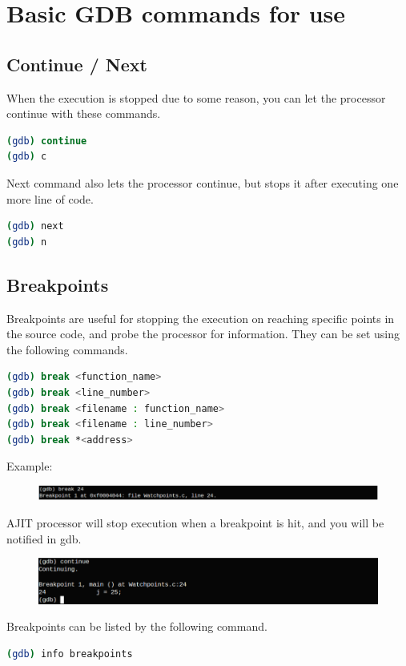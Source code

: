 \documentclass[a4paper, 11pt]{article}
\begin{document}
\section*{Basic GDB commands for use}
\subsection*{Continue / Next}
When the execution is stopped due to some reason, you can let the processor continue with these commands.
\begin{lstlisting}[language=bash]
(gdb) continue
(gdb) c
\end{lstlisting}
Next command also lets the processor continue, but stops it after executing one more line of code.
\begin{lstlisting}[language=bash]
(gdb) next
(gdb) n
\end{lstlisting}

\subsection*{Breakpoints}
Breakpoints are useful for stopping the execution on reaching specific points in the source code, and probe the processor for information. They can be set using the following commands.
\begin{lstlisting}[language=bash]
(gdb) break <function_name>
(gdb) break <line_number>
(gdb) break <filename : function_name>
(gdb) break <filename : line_number>
(gdb) break *<address>
\end{lstlisting}
Example:
\\
\begin{figure}[H]
	\centering
	\includegraphics[width=0.8\columnwidth]{Figs/fourth.png}
\end{figure}

AJIT processor will stop execution when a breakpoint is hit, and you will be notified in gdb.
\begin{figure}[H]
	\centering
	\includegraphics[width=0.8\columnwidth]{Figs/fifth.png}
\end{figure}
Breakpoints can be listed by the following command.
\begin{lstlisting}[language=bash]
(gdb) info breakpoints
\end{lstlisting}
\end{document}
